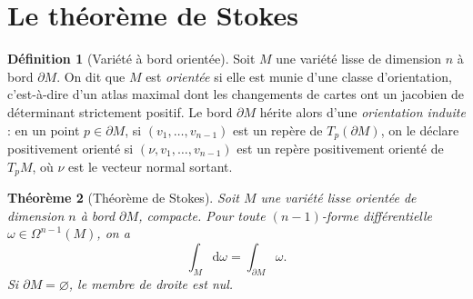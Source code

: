 \documentclass[12pt,a4paper,openany]{book}
\theoremstyle{definition}
\newtheorem{definition}{Définition}[chapter]
\theoremstyle{plain}
\newtheorem{theoreme}[definition]{Théorème}
\theoremstyle{remark}
\newcommand{\dd}{\mathrm{d}}
\begin{document}
\section{Le théorème de Stokes}\label{sec:stokes-varietes}

\begin{definition}[Variété à bord orientée]\label{def:variete-bord-orientee}
Soit $M$ une variété lisse de dimension $n$ à bord $\partial M$. On dit que
$M$ est \emph{orientée} si elle est munie d'une classe d'orientation, c'est-à-dire
d'un atlas maximal dont les changements de cartes ont un jacobien de déterminant
strictement positif. Le bord $\partial M$ hérite alors d'une \emph{orientation
induite} : en un point $p \in \partial M$, si
$(v_1, \dots, v_{n-1})$ est un repère de $T_p(\partial M)$, on le déclare
positivement orienté si $(\nu, v_1, \dots, v_{n-1})$ est un repère positivement
orienté de $T_pM$, où $\nu$ est le vecteur normal sortant.
\end{definition}

\begin{theoreme}[Théorème de Stokes]\label{thm:stokes}
Soit $M$ une variété lisse orientée de dimension $n$ à bord $\partial M$,
compacte. Pour toute $(n-1)$-forme différentielle $\omega \in \Omega^{n-1}(M)$,
on a
\[
  \boxed{\int_M \dd\omega = \int_{\partial M} \omega.}
\]
Si $\partial M = \varnothing$, le membre de droite est nul.
\end{theoreme}
\end{document}

